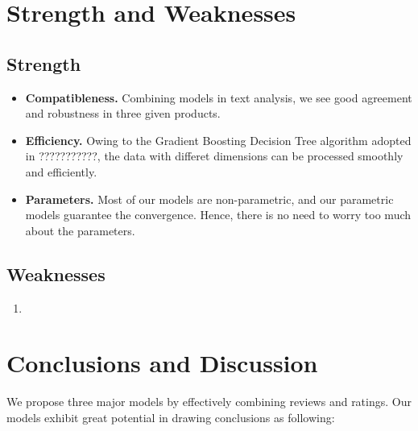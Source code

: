 \documentclass[12pt]{article}%
\begin{document}
\section{Strength and Weaknesses}
\subsection{Strength}
\begin{itemize}
	\item \textbf{Compatibleness.} Combining models in text analysis, we see good agreement and robustness in three given products.%
	\item \textbf{Efficiency.} Owing to the Gradient Boosting Decision Tree algorithm adopted in ???????????, the data with differet dimensions can be processed smoothly and efficiently.
	\item \textbf{Parameters.} Most of our models are non-parametric, and our parametric models guarantee
	the convergence. Hence, there is no need to worry too much about the parameters.
\end{itemize}

\subsection{Weaknesses}
\begin{enumerate}
	\item 
	
	
\end{enumerate}

\section{Conclusions and Discussion}
We propose three major models by effectively combining reviews and ratings. Our models exhibit great potential in drawing conclusions as following:
\end{document}
